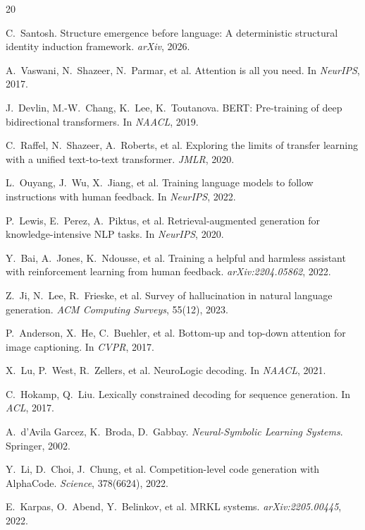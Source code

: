\documentclass[10pt]{article}
\begin{document}
\begin{thebibliography}{20}

C.~Santosh.
Structure emergence before language: A deterministic structural identity induction framework.
\emph{arXiv}, 2026.

A.~Vaswani, N.~Shazeer, N.~Parmar, et al.
Attention is all you need.
In \emph{NeurIPS}, 2017.

J.~Devlin, M.-W.~Chang, K.~Lee, K.~Toutanova.
BERT: Pre-training of deep bidirectional transformers.
In \emph{NAACL}, 2019.

C.~Raffel, N.~Shazeer, A.~Roberts, et al.
Exploring the limits of transfer learning with a unified text-to-text transformer.
\emph{JMLR}, 2020.

L.~Ouyang, J.~Wu, X.~Jiang, et al.
Training language models to follow instructions with human feedback.
In \emph{NeurIPS}, 2022.

P.~Lewis, E.~Perez, A.~Piktus, et al.
Retrieval-augmented generation for knowledge-intensive NLP tasks.
In \emph{NeurIPS}, 2020.

Y.~Bai, A.~Jones, K.~Ndousse, et al.
Training a helpful and harmless assistant with reinforcement learning from human feedback.
\emph{arXiv:2204.05862}, 2022.

Z.~Ji, N.~Lee, R.~Frieske, et al.
Survey of hallucination in natural language generation.
\emph{ACM Computing Surveys}, 55(12), 2023.

P.~Anderson, X.~He, C.~Buehler, et al.
Bottom-up and top-down attention for image captioning.
In \emph{CVPR}, 2017.

X.~Lu, P.~West, R.~Zellers, et al.
NeuroLogic decoding.
In \emph{NAACL}, 2021.

C.~Hokamp, Q.~Liu.
Lexically constrained decoding for sequence generation.
In \emph{ACL}, 2017.

A.~d'Avila Garcez, K.~Broda, D.~Gabbay.
\emph{Neural-Symbolic Learning Systems}.
Springer, 2002.

Y.~Li, D.~Choi, J.~Chung, et al.
Competition-level code generation with AlphaCode.
\emph{Science}, 378(6624), 2022.

E.~Karpas, O.~Abend, Y.~Belinkov, et al.
MRKL systems.
\emph{arXiv:2205.00445}, 2022.


\end{thebibliography}
\end{document}

